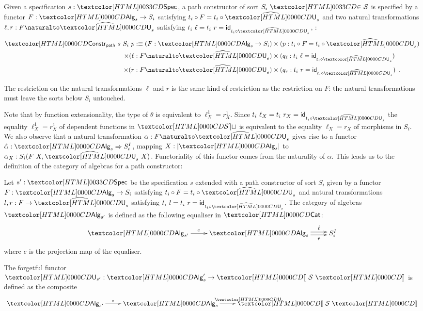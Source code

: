 \begin{definition}
  \label{data-path-constructor}

  Given a specification $s : \specty$, a path constructor of sort
  $\sortsin{S_i}{\Ss}$ is specified by a functor $F : \Alg_s \to S_i$
  satisfying $t_i \circ F = t_i \circ \extendfunc{\Und}_s$ and two natural
  transformations $\ell, r : \Nat{F}{\extendfunc{\Und}_s}$ satisfying
  $t_i\ \ell = t_i\ r = \id_{t_i \circ \extendfunc{\Und}_s}$, \ie:
\begin{align*}
  \Constr_{\ident{path}}\ s\ S_i\ p \ddefeq (F : \Alg_s \to S_i) &\times (p : t_i \circ F = t_i \circ \extendfunc{\Und}_s) \\ 
  \times (\ell : \Nat{F}{\extendfunc{\Und}_s}) &\times (q_\ell : t_i\ \ell = \id_{t_i \circ \extendfunc{\Und}_s}) \\ 
  \times (r : \Nat{F}{\extendfunc{\Und}_s}) &\times (q_r : t_i\ r = \id_{t_i \circ \extendfunc{\Und}_s}) \enspace .
\end{align*}
\end{definition}

The restriction on the natural transformations $\ell$ and $r$ is the
same kind of restriction as the restriction on $F$: the natural
transformations must leave the sorts below $S_i$ untouched.

Note that by function extensionality, the type of $\theta$ is
equivalent to $\ell^1_X = r^1_X$. Since
$t_i\ \ell_X = t_i\ r_X = \id_{t_i \circ \extendfunc{\Und}_s}$ the
equality $\ell^1_X = r^1_X$ of dependent functions in $\SET$ is
equivalent to the equality $\ell_X = r_X$ of morphisms in $S_i$. We
also observe that a natural transformation
$\alpha : \Nat{F}{\extendfunc{\Und}_s}$ gives rise to a functor
$\hat{\alpha} : \Func{\Alg_s}{S_i^I}$, mapping $X : | \Alg_s |$ to
$\alpha_X : S_i(F\ X,\extendfunc{\Und}_s\ X)$. Functoriality of this
functor comes from the naturality of $\alpha$. This leads us to the
definition of the category of algebras for a path constructor:

\begin{definition}
  \label{algebras-path-constructor}

  Let $s' : \specty$ be the specification
  $s$ extended with a path constructor of sort
  $S_i$ given by a functor $F : \Alg_s \to S_i$ satisfying $t_i \circ
  F = t_i \circ \extendfunc{\Und}_s$ and natural transformations $l, r : F \to
  \extendfunc{\Und}_s$ satisfying $t_i\ l = t_i\ r = \id_{t_i \circ
    \extendfunc{\Und}_s}$. The category of algebras
  $\Alg_{s'}$ is defined as the following equaliser in $\Cat$:
  \[
  \xymatrix{
    \Alg_{s'} \ar[r]^{e} &\Alg_s \ar@<-.5ex>[r]_-{\hat{r}} \ar@<.5ex>[r]^-{\hat{\ell}} &S_i^I
  }
  \]
  where $e$ is the projection map of the equaliser.

The forgetful functor $\Und_{s'} : \Alg_s' \to \SortCat{\Ss}$ is defined as the composite
\[
\xymatrix{
    \Alg_{s'} \ar[r]^{e} &\Alg_s \ar[r]^{\Und_s} &\SortCat{\Ss}
}
\]
\end{definition}

